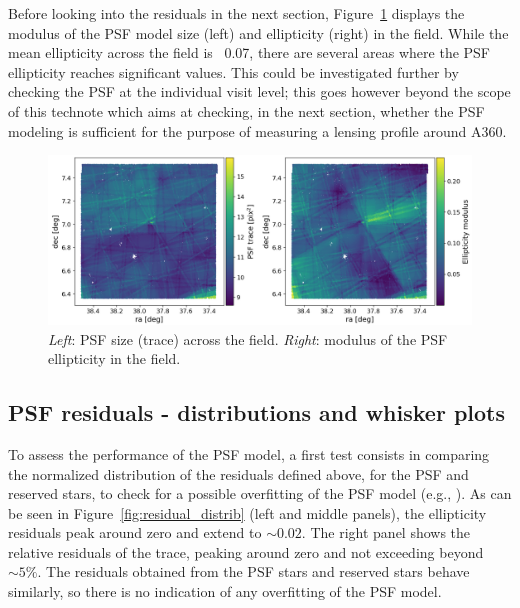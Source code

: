 \documentclass[SE,lsstdraft,authoryear,toc]{lsstdoc}
\begin{document}
Before looking into the residuals in the next section, Figure~\ref{fig:T_and_e} displays the modulus of the PSF model size (left) and ellipticity (right) in the field. While the mean ellipticity across the field is ~0.07, there are several areas where the PSF ellipticity reaches significant values. This could be investigated further by checking the PSF at the individual visit level; this goes however beyond the scope of this technote which aims at checking, in the next section, whether the PSF modeling is sufficient for the purpose of measuring a lensing profile around A360.



\begin{figure}
\centering
\includegraphics[width=\textwidth]{Figures/T_and_e.png}
\caption{\emph{Left}: PSF size (trace) across the field. \emph{Right}: modulus of the PSF ellipticity in the field. \label{fig:T_and_e}}
\end{figure}  


\subsection{PSF residuals - distributions and whisker plots}
To assess the performance of the PSF model, a first test consists in comparing the normalized distribution of the residuals defined above, for the PSF and reserved stars, to check for a possible overfitting of the PSF model (e.g., \citealp{2025OJAp....8E..26S}). As can be seen in Figure~\ref{fig:residual_distrib} (left and middle panels), the ellipticity residuals peak around zero and extend to $\sim 0.02$. The right panel shows the relative residuals of the trace, peaking around zero and not exceeding beyond $\sim 5 \%$. The residuals obtained from the PSF stars and reserved stars behave similarly, so there is no indication of any overfitting of the PSF model.
\end{document}
